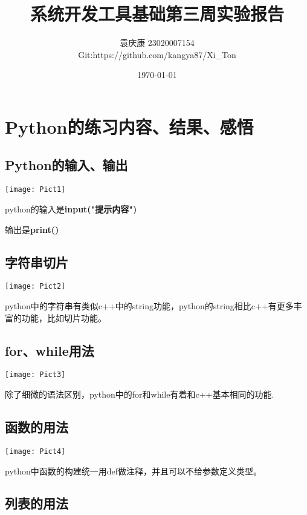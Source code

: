 \documentclass[a4paper, 12pt]{article}
\begin{document}
\title{\textbf{系统开发工具基础第三周实验报告}}
\author{袁庆康 23020007154 \\Git:https://github.com/kangya87/Xi\_Ton}
\date{\today}
\maketitle

\tableofcontents
\newpage
{}

\section{\large Python的练习内容、结果、感悟}
\subsection{\small Python的输入、输出}

\texttt{[image: Pict1]}

python的输入是\textbf{input("提示内容")}

输出是\textbf{print()}
\subsection{\small 字符串切片}

\texttt{[image: Pict2]}

python中的字符串有类似c++中的string功能，python的string相比c++有更多丰富的功能，比如切片功能。


\subsection{\small for、while用法}

\texttt{[image: Pict3]}

除了细微的语法区别，python中的for和while有着和c++基本相同的功能.
\subsection{\small 函数的用法}

\texttt{[image: Pict4]}

python中函数的构建统一用def做注释，并且可以不给参数定义类型。
\subsection{\small 列表的用法}
\end{document}
